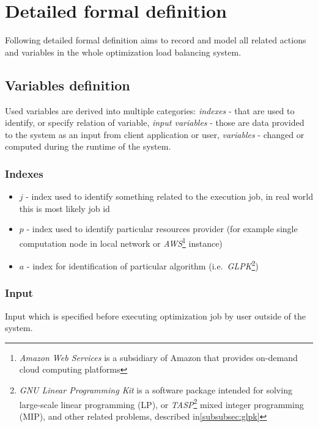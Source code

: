 
\section{Detailed formal definition}\label{sec:formal-definition-detailed}
Following detailed formal definition aims to record and model all related actions and variables in the whole optimization load balancing system.

\subsection{Variables definition}\label{subsec:detailed-variables-definition}
Used variables are derived into multiple categories: 
\textit{indexes} - that are used to identify, or specify relation of variable, 
\textit{input variables} - those are data provided to the system as an input from client application or user,
\textit{variables} - changed or computed during the runtime of the system.

\subsubsection{Indexes}
\begin{itemize}
	\item $j$ - index used to identify something related to the execution job, in real world this is most likely job id
	\item $p$ - index used to identify particular resources provider (for example single computation node in local network
	      or \textit{AWS}\footnote{\textit{Amazon Web Services} is a subsidiary of Amazon that provides on-demand cloud computing platforms} instance)
	\item $a$ - index for identification of particular algorithm (i.e.\ \textit{GLPK}\footnote{\textit{GNU Linear Programming Kit} is a software package intended for solving large-scale linear programming (LP),
	      	or \textit{TASP}\footnote{\textit{Task and Asset Scheduling Platform} - proprietary optimization software developed by Blindspot Solutions, described in\ref{subsubsec:tasp}}
	      	mixed integer programming (MIP), and other related problems, described in\ref{subsubsec:glpk}})
\end{itemize}

\subsubsection{Input}
Input which is specified before executing optimization job by user outside of the system.

